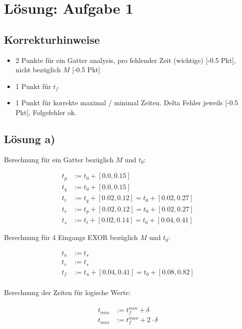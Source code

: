 \documentclass{scrartcl}[9pt, a4paper]
\begin{document}
\section*{Lösung: Aufgabe 1}
\subsection*{Korrekturhinweise}

\begin{itemize}
	\item 2 Punkte für ein Gatter analysis, pro fehlender Zeit (wichtige) [-0.5 Pkt], nicht bezüglich $M$ [-0.5 Pkt]
  \item 1 Punkt für $t_f$
  \item 1 Punkt für korrekte maximal / minimal Zeiten. Delta Fehler jeweils [-0.5 Pkt], Folgefehler ok.
\end{itemize}

\subsection*{Lösung a)}

Berechnung für ein Gatter bezüglich $M$ und $t_0$:

\begin{align*}
	t_p & := t_0 + [0.0, 0.15]                       \\
	t_q & := t_0 + [0.0, 0.15]                       \\
	t_t & := t_q + [0.02, 0.12] = t_0 + [0.02, 0.27] \\
	t_r & := t_p + [0.02, 0.12] = t_0 + [0.02, 0.27] \\
	t_s & := t_t + [0.02, 0.14] = t_0 + [0.04, 0.41]
\end{align*}

Berechnung für 4 Eingangs EXOR bezüglich $M$ und $t_0$:

\begin{align*}
	t_u & := t_s                                     \\
	t_v & := t_s                                     \\
	t_f & := t_u + [0.04, 0.41] = t_0 + [0.08, 0.82] \\
\end{align*}

Berechnung der Zeiten für logische Werte:

\begin{align*}
	t_{min} & := t_f^{min} + \delta         \\
	t_{min} & := t_f^{max} + 2 \cdot \delta \\
\end{align*}
\end{document}
